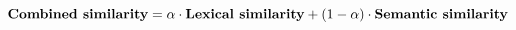 \begin{equation}
  \text{\textbf{Combined similarity}} =
    \alpha\cdot\text{\textbf{Lexical similarity}} +
    (1 - \alpha)\cdot\text{\textbf{Semantic similarity}}
\end{equation}
